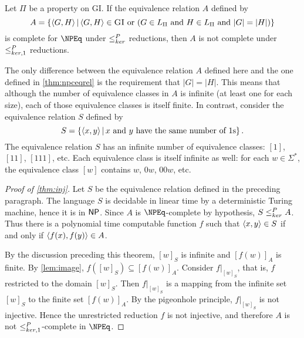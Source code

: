 \begin{theorem}\label{thm:inj}
  Let $\Pi$ be a property on \textsc{GI}.
  If the equivalence relation $A$ defined by
  \begin{equation*}
    A = \left\{ \langle G,H\rangle \, \middle| \, \langle G,H\rangle \in \textsc{GI} \text{ or } (G \in L_\Pi \text{ and } H \in L_\Pi \text{ and } |G| = |H|) \right\}
  \end{equation*}
  is complete for $\NPEq$ under $\leq^{P}_{ker}$ reductions, then $A$ is not complete under $\leq^{P}_{ker,1}$ reductions.
\end{theorem}

The only difference between the equivalence relation $A$ defined here and the one defined in \autoref{thm:npceqrel} is the requirement that $|G| = |H|$.
This means that although the number of equivalence classes in $A$ is infinite (at least one for each size), each of those equivalence classes is itself finite.
In contrast, consider the equivalence relation $S$ defined by
\begin{equation*}\label{eq:ones}
  S = \left\{ \langle x,y\rangle \, \middle| \, x \text{ and } y \text{ have the same number of } 1 \text{s} \right\}.
\end{equation*}
The equivalence relation $S$ has an infinite number of equivalence classes: $[1]$, $[11]$, $[111]$, etc.
Each equivalence class is itself infinite as well: for each $w \in \Sigma^*$, the equivalence class $[w]$ contains $w$, $0w$, $00w$, etc.

\begin{proof}[Proof of \autoref{thm:inj}]
  Let $S$ be the equivalence relation defined in the preceding paragraph.
  The language $S$ is decidable in linear time by a deterministic Turing machine, hence it is in ${\mathsf{NP}}$.
  Since $A$ is $\NPEq$-complete by hypothesis, $S \leq^{P}_{ker} A$.
  Thus there is a polynomial time computable function $f$ such that $\langle x,y\rangle \in S$ if and only if $\langle f(x),f(y)\rangle \in A$.

  By the discussion preceding this theorem, $[w]_S$ is infinite and $[f(w)]_A$ is finite.
  By \autoref{lem:image}, $f([w]_S) \subseteq [f(w)]_A$.
  Consider $f|_{[w]_S}$, that is, $f$ restricted to the domain $[w]_S$.
  Then $f|_{[w]_S}$ is a mapping from the infinite set $[w]_S$ to the finite set $[f(w)]_A$.
  By the pigeonhole principle, $f|_{[w]_S}$ is not injective.
  Hence the unrestricted reduction $f$ is not injective, and therefore $A$ is not $\leq^{P}_{ker,1}$-complete in $\NPEq$.
\end{proof}
